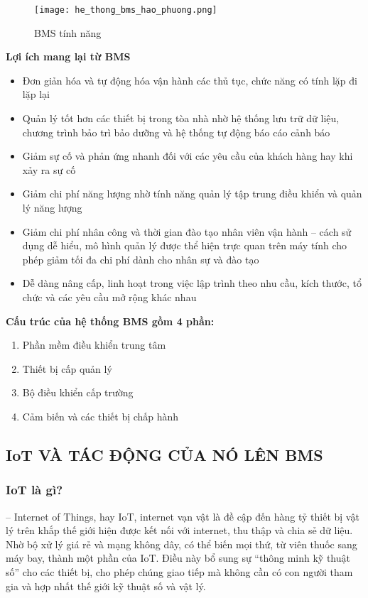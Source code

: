 \begin{figure}[H]
	\centering
	\texttt{[image: he\_thong\_bms\_hao\_phuong.png]}	
	\caption{BMS tính năng}
\end{figure}
	
	\break
	\textbf{Lợi ích mang lại từ BMS}
	\begin{itemize}[leftmargin=2cm]
		\item Đơn giản hóa và tự động hóa vận hành các thủ tục, chức năng có tính lặp đi lặp lại
		\item Quản lý tốt hơn các thiết bị trong tòa nhà nhờ hệ thống lưu trữ dữ liệu, chương trình bảo trì bảo dưỡng và hệ thống tự động báo cáo cảnh báo
		\item Giảm sự cố và phản ứng nhanh đối với các yêu cầu của khách hàng hay khi xảy ra sự cố
		\item Giảm chi phí năng lượng nhờ tính năng quản lý tập trung điều khiển và quản lý năng lượng
		\item Giảm chi phí nhân công và thời gian đào tạo nhân viên vận hành – cách sử dụng dễ hiểu, mô hình quản lý được thể hiện trực quan trên máy tính cho phép giảm tối đa chi phí dành cho nhân sự và đào tạo
		\item Dễ dàng nâng cấp, linh hoạt trong việc lập trình theo nhu cầu, kích thước, tổ chức và các yêu cầu mở rộng khác nhau
	\end{itemize}
	
	\textbf{Cấu trúc của hệ thống BMS gồm 4 phần:}
	\begin{enumerate}
		\setlength{\itemindent}{2cm}
		\item Phần mềm điều khiển trung tâm
		\item Thiết bị cấp quản lý
		\item Bộ điều khiển cấp trường
		\item Cảm biến và các thiết bị chấp hành
	\end{enumerate}

	\subsection{IoT VÀ TÁC ĐỘNG CỦA NÓ LÊN BMS}
	\subsubsection{IoT là gì?}
	-- Internet of Things, hay IoT, internet vạn vật là đề cập đến hàng tỷ thiết bị vật lý trên khắp thế giới hiện được kết nối với internet, thu thập và chia sẻ dữ liệu. Nhờ bộ xử lý giá rẻ và mạng không dây, có thể biến mọi thứ, từ viên thuốc sang máy bay, thành một phần của IoT. Điều này bổ sung sự “thông minh kỹ thuật số” cho các thiết bị, cho phép chúng giao tiếp mà không cần có con người tham gia và hợp nhất thế giới kỹ thuật số và vật lý.

